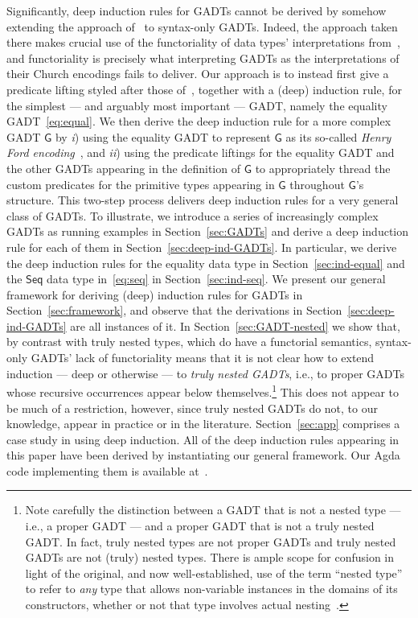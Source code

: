 \documentclass[sigplan,10pt,anonymous,review]{acmart}
\begin{document}
Significantly, deep induction rules for GADTs cannot be derived by
somehow extending the approach of~\cite{jp20} to syntax-only
GADTs. Indeed, the approach taken there makes crucial use of the
functoriality of data types' interpretations from~\cite{jp19}, and
functoriality is precisely what interpreting GADTs as the
interpretations of their Church encodings fails to deliver. Our
approach is to instead first give a predicate lifting styled after
those of~\cite{jp20}, together with a (deep) induction rule, for the
simplest --- and arguably most important --- GADT, namely the equality
GADT~\eqref{eq:equal}. We then derive the deep induction rule for a
more complex GADT $\mathsf{G}$ by {\em i}) using the equality GADT to
represent $\mathsf{G}$ as its so-called {\em Henry Ford
  encoding}~\cite{ch03,hin03,mcb99,sjsv09,sp04}, and {\em ii}) using
the predicate liftings for the equality GADT and the other GADTs
appearing in the definition of $\mathsf{G}$ to appropriately thread
the custom predicates for the primitive types appearing in
$\mathsf{G}$ throughout $\mathsf{G}$'s structure. This two-step
process delivers deep induction rules for a very general class of
GADTs. To illustrate, we introduce a series of increasingly complex
GADTs as running examples in Section~\ref{sec:GADTs} and derive a deep
induction rule for each of them in
Section~\ref{sec:deep-ind-GADTs}. In particular, we derive the deep
induction rules for the equality data type in
Section~\ref{sec:ind-equal} and the $\mathsf{Seq}$ data type
in~\eqref{eq:seq} in Section~\ref{sec:ind-seq}. We present our general
framework for deriving (deep) induction rules for GADTs in
Section~\ref{sec:framework}, and observe that the derivations in
Section~\ref{sec:deep-ind-GADTs} are all instances of it.  In
Section~\ref{sec:GADT-nested} we show that, by contrast with truly
nested types, which do have a functorial semantics, syntax-only GADTs'
lack of functoriality means that it is not clear how to extend
induction --- deep or otherwise --- to {\em truly nested GADTs}, i.e.,
to proper GADTs whose recursive occurrences appear below
themselves.\footnote{Note carefully the distinction between a GADT
  that is not a nested type --- i.e., a proper GADT --- and a proper
  GADT that is not a truly nested GADT.  In fact, truly nested types
  are not proper GADTs and truly nested GADTs are not (truly) nested
  types. There is ample scope for confusion in light of the original,
  and now well-established, use of the term ``nested type'' to refer
  to {\em any} type that allows non-variable instances in the domains
  of its constructors, whether or not that type involves actual
  nesting~\cite{bm98}.}  This does not appear to be much of a
restriction, however, since truly nested GADTs do not, to our
knowledge, appear in practice or in the
literature. Section~\ref{sec:app} comprises a case study in using deep
induction. All of the deep induction rules appearing in this paper
have been derived by instantiating our general framework. Our Agda
code implementing them is available at~\cite{web-page}.
\end{document}
